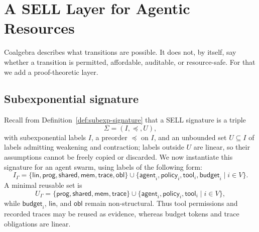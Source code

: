 \documentclass[a4paper,fleqn]{cas-sc}
\begin{document}
\section{A SELL Layer for Agentic Resources}\label{sec:sell-layer}

Coalgebra describes what transitions are possible. It does not, by itself, say whether a transition is permitted, affordable, auditable, or resource-safe. For that we add a proof-theoretic layer.

\subsection{Subexponential signature}

Recall from Definition~\ref{def:subexp-signature} that a SELL signature is a triple
\[
  \Sigma=(I,\preceq,U),
\]
with subexponential labels \(I\), a preorder \(\preceq\) on \(I\), and an unbounded set \(U\subseteq I\) of labels admitting weakening and contraction; labels outside \(U\) are linear, so their assumptions cannot be freely copied or discarded. We now instantiate this signature for an agent swarm, using labels of the following form:
\[
  I_{\Gamma}=
  \{\mathsf{lin},\mathsf{prog},\mathsf{shared},\mathsf{mem},\mathsf{trace},\mathsf{obl}\}
  \cup
  \{\mathsf{agent}_i,\mathsf{policy}_i,\mathsf{tool}_i,\mathsf{budget}_i\mid i\in V\}.
\]
A minimal reusable set is
\[
  U_{\Gamma}=\{\mathsf{prog},\mathsf{shared},\mathsf{mem},\mathsf{trace}\}
  \cup\{\mathsf{agent}_i,\mathsf{policy}_i,\mathsf{tool}_i\mid i\in V\},
\]
while \(\mathsf{budget}_i\), \(\mathsf{lin}\), and \(\mathsf{obl}\) remain non-structural. Thus tool permissions and recorded traces may be reused as evidence, whereas budget tokens and trace obligations are linear.
\end{document}
